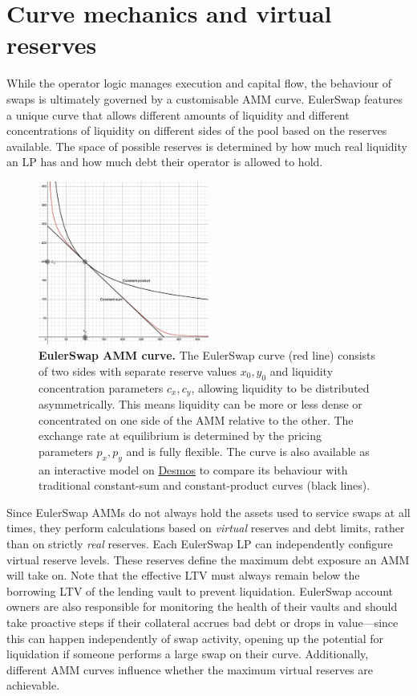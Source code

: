 \documentclass{article}
\begin{document}
\section{Curve mechanics and virtual reserves}

While the operator logic manages execution and capital flow, the behaviour of swaps is ultimately governed by a customisable AMM curve. EulerSwap features a unique curve that allows different amounts of liquidity and different concentrations of liquidity on different sides of the pool based on the reserves available. The space of possible reserves is determined by how much real liquidity an LP has and how much debt their operator is allowed to hold. 

\begin{figure}[h]
\centering
\includegraphics[width=0.5\textwidth]{curve.png}
\caption{\textbf{EulerSwap AMM curve.} The EulerSwap curve (red line) consists of two sides with separate reserve values $x_0, y_0$ and liquidity concentration parameters $c_x, c_y$, allowing liquidity to be distributed asymmetrically. This means liquidity can be more or less dense or concentrated on one side of the AMM relative to the other. The exchange rate at equilibrium is determined by the pricing parameters $p_x, p_y$ and is fully flexible. The curve is also available as an interactive model on \href{https://www.desmos.com/calculator/iczoxr4mhw}{Desmos} to compare its behaviour with traditional constant-sum and constant-product curves (black lines).}
\label{fig:fig1}
\end{figure}

Since EulerSwap AMMs do not always hold the assets used to service swaps at all times, they perform calculations based on \emph{virtual} reserves and debt limits, rather than on strictly \emph{real} reserves. Each EulerSwap LP can independently configure virtual reserve levels. These reserves define the maximum debt exposure an AMM will take on. Note that the effective LTV must always remain below the borrowing LTV of the lending vault to prevent liquidation. EulerSwap account owners are also responsible for monitoring the health of their vaults and should take proactive steps if their collateral accrues bad debt or drops in value—since this can happen independently of swap activity, opening up the potential for liquidation if someone performs a large swap on their curve. Additionally, different AMM curves influence whether the maximum virtual reserves are achievable.
\end{document}
